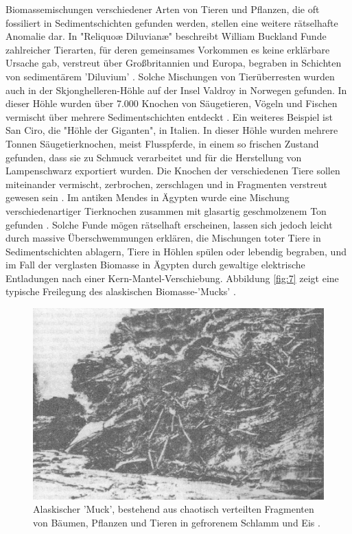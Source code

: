 \documentclass[10pt,twocolumn,letterpaper]{article}
\begin{document}
Biomassemischungen verschiedener Arten von Tieren und Pflanzen, die oft fossiliert in Sedimentschichten gefunden werden, stellen eine weitere rätselhafte Anomalie dar. In "Reliquoæ Diluvianæ" beschreibt William Buckland Funde zahlreicher Tierarten, für deren gemeinsames Vorkommen es keine erklärbare Ursache gab, verstreut über Großbritannien und Europa, begraben in Schichten von sedimentärem 'Diluvium' \cite{58}. Solche Mischungen von Tierüberresten wurden auch in der Skjonghelleren-Höhle auf der Insel Valdroy in Norwegen gefunden. In dieser Höhle wurden über 7.000 Knochen von Säugetieren, Vögeln und Fischen vermischt über mehrere Sedimentschichten entdeckt \cite{59}. Ein weiteres Beispiel ist San Ciro, die "Höhle der Giganten", in Italien. In dieser Höhle wurden mehrere Tonnen Säugetierknochen, meist Flusspferde, in einem so frischen Zustand gefunden, dass sie zu Schmuck verarbeitet und für die Herstellung von Lampenschwarz exportiert wurden. Die Knochen der verschiedenen Tiere sollen miteinander vermischt, zerbrochen, zerschlagen und in Fragmenten verstreut gewesen sein \cite{60,61}. Im antiken Mendes in Ägypten wurde eine Mischung verschiedenartiger Tierknochen zusammen mit glasartig geschmolzenem Ton gefunden \cite{57}. Solche Funde mögen rätselhaft erscheinen, lassen sich jedoch leicht durch massive Überschwemmungen erklären, die Mischungen toter Tiere in Sedimentschichten ablagern, Tiere in Höhlen spülen oder lebendig begraben, und im Fall der verglasten Biomasse in Ägypten durch gewaltige elektrische Entladungen nach einer Kern-Mantel-Verschiebung. Abbildung \ref{fig:7} zeigt eine typische Freilegung des alaskischen Biomasse-'Mucks' \cite{56}.

\begin{figure}[t]
\begin{center}
   \includegraphics[width=1\linewidth]{muck-crop.jpeg}
\end{center}
   \caption{Alaskischer 'Muck', bestehend aus chaotisch verteilten Fragmenten von Bäumen, Pflanzen und Tieren in gefrorenem Schlamm und Eis \cite{146}.}
\label{fig:7}
\label{fig:onecol}
\end{figure}
\end{document}
